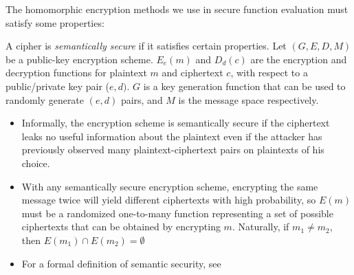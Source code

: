 The homomorphic encryption methods we use in secure function evaluation
must satisfy some properties:
\begin{description}
\label{semantically-secure-cipher} 
\item [{Semantically-secure~cipher.}] A cipher is \textit{semantically
secure} \cite{Goldwasser:Micali} if it satisfies certain properties.
Let $(G,E,D,M)$ be a public-key encryption scheme. $E_{e}(m)$ and
$D_{d}(c)$ are the encryption and decryption functions for plaintext
$m$ and ciphertext $c$, with respect to a public/private key pair
($e,d)$. $G$ is a key generation function that can be used to randomly
generate $(e,d)$ pairs, and $M$ is the message space respectively. \end{description}
\begin{itemize}
\item Informally, the encryption scheme is semantically secure if the ciphertext
leaks no useful information about the plaintext even if the attacker
has previously observed many plaintext-ciphertext pairs on plaintexts
of his choice. 
%
%
%
\item With any semantically secure encryption scheme, encrypting the same
message twice will yield different ciphertexts with high probability,
so $E(m)$ must be a randomized one-to-many function representing
a set of possible ciphertexts that can be obtained by encrypting $m$.
Naturally, if $m_{1}\neq m_{2}$, then $E(m_{1})\cap E(m_{2})=\emptyset$ 
\item For a formal definition of semantic security, see \cite{Goldreich:vol2}
\end{itemize}
